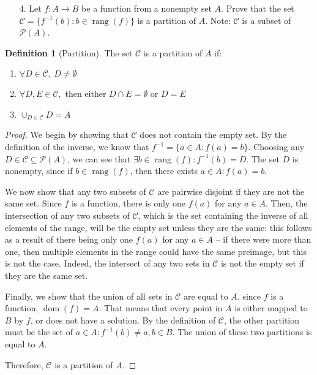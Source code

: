 \documentclass[10pt]{article}
\theoremstyle{definition}
\newtheorem{definition}[equation]{Definition}
\theoremstyle{plain}
\DeclareMathOperator\dom{dom}
\DeclareMathOperator\rang{rang}
\begin{document}
\pagebreak



\begin{enumerate}
\item[4.] Let $f:A \to B$ be a function from a nonempty set $A$.  Prove that the set $ \mathcal{C} = \{f^{-1}(b): b \in \rang(f)\}$ is a partition of $A$.  Note:  $\mathcal{C}$ is a subset of $\mathscr{P}(A)$.
\end{enumerate}



\setcounter{equation}{0}
\begin{definition}[Partition]
The set $\mathcal{C}$ is a partition of $A$ if:
\begin{enumerate}
  \item $\forall D\in\mathcal{C},\ D\neq \emptyset$
  \item $\forall D,E\in\mathcal{C},$ then either $D\cap E = \emptyset$ or $D=E$
  \item $\cup_{D\in\mathcal{C}} D = A$
\end{enumerate}
\end{definition}

\begin{proof}
We begin by showing that $\mathcal{C}$ does not contain the empty set. By the definition of the inverse, we know that $f^{-1} = \{a\in A:f(a) = b\}$. Choosing any $D\in\mathcal{C}\subseteq\mathscr{P}(A)$, we can see that $\exists b\in\rang(f):f^{-1}(b)=D$. The set $D$ is nonempty, since if $b\in\rang(f)$, then there exists $a\in A:f(a)=b$.

We now show that any two subsets of $\mathcal{C}$ are pairwise disjoint if they are not the same set. Since $f$ is a function, there is only one $f(a)$ for any $a\in A$. Then, the intersection of any two subsets of $\mathcal{C}$, which is the set containing the inverse of all elements of the range, will be the empty set unless they are the same: this follows as a result of there being only one $f(a)$ for any $a \in A$ -- if there were more than one, then multiple elements in the range could have the same preimage, but this is not the case. Indeed, the intersect of any two sets in $\mathcal{C}$ is not the empty set if they are the same set.

Finally, we show that the union of all sets in $\mathcal{C}$ are equal to $A$. since $f$ is a function, $\dom(f)=A$. That means that every point in $A$ is either mapped to $B$ by $f$, or does not have a solution. By the definition of $\mathcal{C}$, the other partition must be the set of $a\in A: f^{-1}(b)\neq a, b\in B$. The union of these two partitions is equal to $A$.

Therefore, $\mathcal{C}$ is a partition of $A$.


\end{proof}
\end{document}
